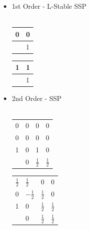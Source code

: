 \documentclass[10pt]{beamer}
\begin{document}
    \begin{frame}
      \begin{itemize}
        \item 1st Order - L-Stable SSP \hfill \\ \hfill \\
          \begin{tabular}{r|l}
            0 & 0 \\
            \midrule
              & 1 
          \end{tabular}\hspace{0.5cm}
          \begin{tabular}{r|l}
            1 & 1 \\
            \midrule
              & 1 
          \end{tabular}

        \vspace{0.5cm}

        \item 2nd Order - SSP \hfill \\ \hfill \\
          \begin{tabular}{r|lll}
            0 & 0 & 0 & 0 \\
            0 & 0 & 0 & 0 \\
            1 & 0 & 1 & 0 \\
            \midrule
              & 0 & $\frac{1}{2}$ & $\frac{1}{2}$ \\
          \end{tabular}\hspace{0.5cm}
          \begin{tabular}{r|lll}
            $\frac{1}{2}$ & $\frac{1}{2}$ & 0 & 0 \\
            0 & $-\frac{1}{2}$ & $\frac{1}{2}$ & 0 \\
            1 & 0 & $\frac{1}{2}$ & $\frac{1}{2}$ \\
            \midrule
              & 0 & $\frac{1}{2}$ & $\frac{1}{2}$ \\
          \end{tabular}
      \end{itemize}
    \end{frame}
\end{document}
